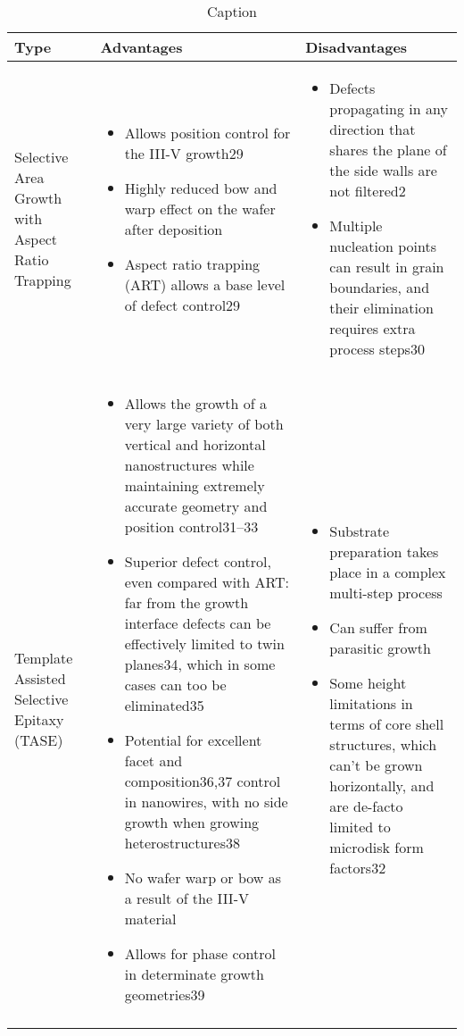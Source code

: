     \begin{sidewaystable}
    \centering
    \begin{longtable}{p{}|p{}|p{}}
    Type & Advantages & Disadvantages \\ \hline \hline
    Selective Area Growth with Aspect Ratio Trapping & 
    \begin{itemize}
        \item Allows position control for the III-V growth29
        \item Highly reduced bow and warp effect on the wafer after deposition
        \item Aspect ratio trapping (ART) allows a base level of defect control29
    \end{itemize}  & \begin{itemize}
        \item Defects propagating in any direction that shares the plane of the side walls are not filtered2
        \item Multiple nucleation points can result in grain boundaries, and their elimination requires extra process steps30
    \end{itemize} \\ \hline
    Template Assisted Selective Epitaxy (TASE) & 
    \begin{itemize}
        \item Allows the growth of a very large variety of both vertical and horizontal nanostructures while maintaining extremely accurate geometry and  position control31–33
        \item Superior defect control, even compared with ART: far from the growth interface defects can be effectively limited to twin planes34, which in some cases can too be eliminated35
        \item Potential for excellent facet and composition36,37 control in nanowires, with no side growth when growing heterostructures38 
        \item No wafer warp or bow as a result of the III-V material
        \item Allows for phase control in determinate growth geometries39
    \end{itemize} & 
    \begin{itemize}
        \item Substrate preparation takes place in a complex multi-step process
        \item Can suffer from parasitic growth
        \item Some height limitations in terms of core shell structures, which can’t be grown horizontally, and are de-facto limited to microdisk form factors32
    \end{itemize} \\ \hline
    \caption{Caption}
    \label{tab:methods2}
\end{longtable}
\end{sidewaystable}

